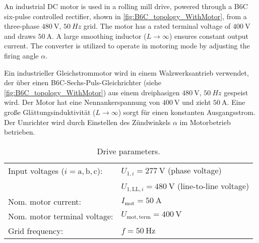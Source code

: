 

An industrial DC motor is used in a rolling mill drive, powered through a B6C six-pulse controlled rectifier, 
shown in \autoref{fig:B6C_topology_WithMotor}, from a three-phase $\SI{480}{\volt}$, $\SI{50}{Hz}$ grid. The motor has a rated terminal voltage of $\SI{400}{\volt}$
and draws $\SI{50}{\ampere}$. A large smoothing inductor ($L \to \infty$) ensures constant output current. 
The converter is utilized to operate in motoring mode by adjusting the firing angle $\alpha$.

\begin{germanblock}
    Ein industrieller Gleichstrommotor wird in einem Walzwerksantrieb verwendet, der über einen B6C-Sechs-Puls-Gleichrichter
(siehe \autoref{fig:B6C_topology_WithMotor}) aus einem dreiphasigen $\SI{480}{\volt}$, $\SI{50}{Hz}$ gespeist wird. Der Motor hat eine Nennankerspannung
von $\SI{400}{\volt}$ und zieht $\SI{50}{\ampere}$. Eine große Glättungsinduktivität ($L \to \infty$) sorgt für einen konstanten Ausgangsstrom.
 Der Umrichter wird durch Einstellen des Zündwinkels $\alpha$ im Motorbetrieb betrieben.
\end{germanblock}

\begin{table}[ht]
    \centering  %
    \begin{tabular}{ll}
        \toprule
        Input voltages ($i=\mathrm{a,b,c}$): & $U_{\mathrm{1},i}=\SI{277}{\volt}$ (phase voltage) \\
                        & $U_{\mathrm{1,LL},i} = \SI{480}{\volt}$ (line-to-line voltage)\\
        Nom. motor current: & $I_{\mathrm{mot}} = \SI{50}{\ampere}$ \\
        Nom. motor terminal voltage: & $U_\mathrm{mot,term} = \SI{400}{\volt}$ \\ 
        Grid frequency: & $f= \SI{50}{\hertz}$ \\ 
        \bottomrule
    \end{tabular}
    \caption{Drive parameters.}  
    \label{table:Task04_ParametersOfTheCircuit}
\end{table}
